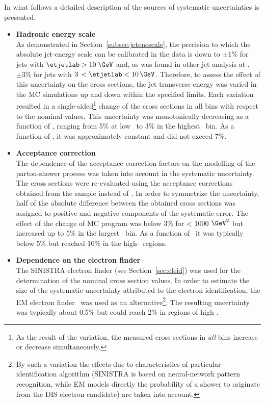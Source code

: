 In what follows a detailed description of the sources of systematic uncertainties is presented.
\begin{itemize}
	\item \textbf{Hadronic energy scale} \\
		As demonstrated in Section~\ref{subsec:jetenescale}, the precision to which the absolute jet-energy scale can be calibrated in the data is down to $\pm1\%$ for jets with $\etjetlab > 10\;\GeV$ and, as was found in other jet analysis at \zeus, $\pm3\%$ for jets with $3\,< \etjetlab < 10\,\GeV$. Therefore, to assess the effect of this uncertainty on the cross sections, the jet transverse energy was varied in the MC simulations up and down within the specified limits. Each variation resulted in a single-sided\footnote{As the result of the variation, the measured cross sections in \textit{all} bins increase or decrease simultaneously.} change of the cross sections in all bins with respect to the nominal values. This uncertainty was monotonically decreasing as a function of \qsq, ranging from 5\% at low \qsq~to 3\% in the highest \qsq~bin. As a function of \etjetb, it was approximately constant and did not exceed 7\%.
		
	\item \textbf{Acceptance correction} \\
		The dependence of the acceptance correction factors on the modelling of the parton-shower process was taken into account in the systematic uncertainty. The cross sections were re-evaluated using the acceptance corrections obtained from the \ariadne sample instead of \lepto. In order to symmetrize the uncertainty, half of the absolute difference between the obtained cross sections was assigned to positive and negative components of the systematic error. The effect of the change of MC program was below 3\% for \qsq < 1000 $\GeV^2$ but increased up to 5\% in the largest \qsq~bin. As a function of \etjetb~it was typically below 5\% but reached 10\% in the high-\etjetb~regions.
			
	\item \textbf{Dependence on the electron finder}\\
		The \textsc{SINISTRA} electron finder (see Section~\ref{sec:eleid}) was used for the determination of the nominal cross section values. In order to estimate the size of the systematic uncertainty attributed to the electron identification, the \textsc{EM} electron finder~\cite{epj:c11:427,upub:Straub:url} was used as an alternative\footnote{By such a variation the effects due to characteristics of particular identification algorithm (SINISTRA is based on neural-network pattern recognition, while EM models directly the probability of a shower to originate from the DIS electron candidate) are taken into account.}. The resulting uncertainty was typically about 0.5\% but could reach 2\% in regions of high \qsq.
	

\end{itemize}
